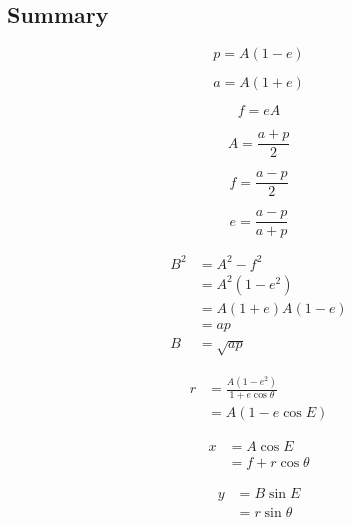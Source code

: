 \begin{framed}
\subsection*{Summary}

\begin{equation*}
p=A(1-e)
\end{equation*}

\begin{equation*}
a=A(1+e)
\end{equation*}

\begin{equation*}
f=eA
\end{equation*}

\begin{equation*}
A=\frac{a+p}{2}
\end{equation*}

\begin{equation*}
f=\frac{a-p}{2}
\end{equation*}

\begin{equation*}
e=\frac{a-p}{a+p}
\end{equation*}

\begin{align*}
B^2 &= A^2-f^2\\
&=A^2(1-e^2)\\
&=A(1+e)A(1-e)\\
&=ap\\
B&=\sqrt{ap}
\end{align*}

\begin{align*}
r&=\frac{A(1-e^2)}{1+e\cos\theta}\\
&=A\left( 1-e\cos E\right)
\end{align*}

\begin{align*}
x&=A\cos E\\
&=f+r\cos\theta
\end{align*}

\begin{align*}
y&=B\sin E\\
&=r \sin \theta
\end{align*}

\end{framed}